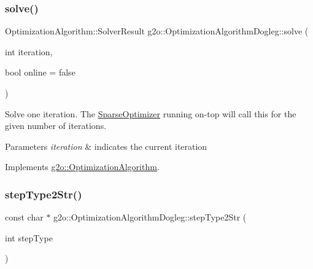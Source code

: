 \mbox{\label{classg2o_1_1_optimization_algorithm_dogleg_ace62fd809c18655bd7ff104285748610}} 
\subsubsection{\texorpdfstring{solve()}{solve()}}
{\footnotesize\ttfamily Optimization\+Algorithm\+::\+Solver\+Result g2o\+::\+Optimization\+Algorithm\+Dogleg\+::solve (\begin{DoxyParamCaption}\item[{int}]{iteration,  }\item[{bool}]{online = {\ttfamily false} }\end{DoxyParamCaption})\hspace{0.3cm}{\ttfamily [virtual]}}

Solve one iteration. The \mbox{\hyperlink{classg2o_1_1_sparse_optimizer}{Sparse\+Optimizer}} running on-\/top will call this for the given number of iterations. 
\begin{DoxyParams}{Parameters}
{\em iteration} & indicates the current iteration \\
\hline
\end{DoxyParams}


Implements \mbox{\hyperlink{classg2o_1_1_optimization_algorithm_ab174deeeb2551ceaf715ea09f0f9c077}{g2o\+::\+Optimization\+Algorithm}}.

\mbox{\label{classg2o_1_1_optimization_algorithm_dogleg_a65f193c6451ffcd2bd6fd8f8d19e2a12}} 
\subsubsection{\texorpdfstring{step\+Type2\+Str()}{stepType2Str()}}
{\footnotesize\ttfamily const char $\ast$ g2o\+::\+Optimization\+Algorithm\+Dogleg\+::step\+Type2\+Str (\begin{DoxyParamCaption}\item[{int}]{step\+Type }\end{DoxyParamCaption})\hspace{0.3cm}{\ttfamily [static]}}



